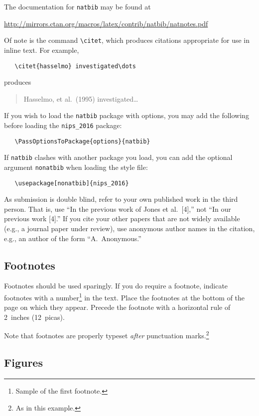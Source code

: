 \documentclass{article}
\begin{document}
The documentation for \verb+natbib+ may be found at
\begin{center}
  \url{http://mirrors.ctan.org/macros/latex/contrib/natbib/natnotes.pdf}
\end{center}
Of note is the command \verb+\citet+, which produces citations
appropriate for use in inline text.  For example,
\begin{verbatim}
   \citet{hasselmo} investigated\dots
\end{verbatim}
produces
\begin{quote}
  Hasselmo, et al.\ (1995) investigated\dots
\end{quote}

If you wish to load the \verb+natbib+ package with options, you may
add the following before loading the \verb+nips_2016+ package:
\begin{verbatim}
   \PassOptionsToPackage{options}{natbib}
\end{verbatim}

If \verb+natbib+ clashes with another package you load, you can add
the optional argument \verb+nonatbib+ when loading the style file:
\begin{verbatim}
   \usepackage[nonatbib]{nips_2016}
\end{verbatim}

As submission is double blind, refer to your own published work in the
third person. That is, use ``In the previous work of Jones et
al.\ [4],'' not ``In our previous work [4].'' If you cite your other
papers that are not widely available (e.g., a journal paper under
review), use anonymous author names in the citation, e.g., an author
of the form ``A.\ Anonymous.''

\subsection{Footnotes}

Footnotes should be used sparingly.  If you do require a footnote,
indicate footnotes with a number\footnote{Sample of the first
  footnote.} in the text. Place the footnotes at the bottom of the
page on which they appear.  Precede the footnote with a horizontal
rule of 2~inches (12~picas).

Note that footnotes are properly typeset \emph{after} punctuation
marks.\footnote{As in this example.}

\subsection{Figures}
\end{document}
